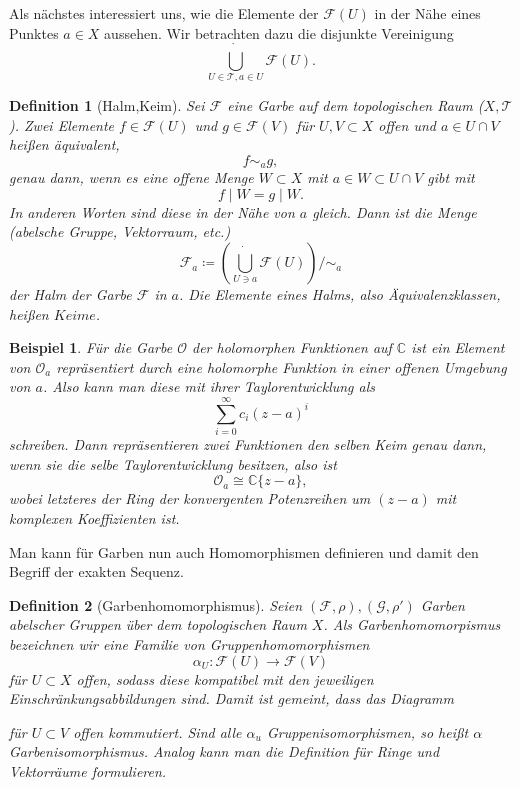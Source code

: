 \documentclass[11pt,a4paper]{scrartcl}
\theoremstyle{thm}
\theoremstyle{def}
\newtheorem{defi}{Definition}[section]
\newtheorem{bsp}{Beispiel}[section]
\theoremstyle{remark}
\begin{document}
Als nächstes interessiert uns, wie die Elemente der $\mathcal{F}(U)$ in der Nähe eines Punktes $a\in X$ aussehen. Wir betrachten dazu die disjunkte Vereinigung
\[
\dot{\bigcup_{U\in \mathcal{T},a\in U}} \mathcal{F}(U).
\]

\begin{defi}[Halm,Keim]
Sei $\mathcal{F}$ eine Garbe auf dem topologischen Raum ($X,\mathcal{T}$). Zwei Elemente $f\in\mathcal{F}(U)$ und $g\in \mathcal{F}(V)$ für $U,V\subset X$ offen und $a\in U\cap V$ heißen äquivalent,
\[
f\sim_a g,
\]
genau dann, wenn es eine offene Menge $W\subset X$ mit $a\in W\subset U\cap V$ gibt mit
\[
f\mid W = g\mid W.
\]
In anderen Worten sind diese in der Nähe von $a$ gleich. Dann ist die Menge (abelsche Gruppe, Vektorraum, etc.)
\[
\mathcal{F}_a \coloneqq \left( \dot{\bigcup_{U\ni a}} \mathcal{F}(U) \right) /\sim_a
\]
der \emph{Halm} der Garbe $\mathcal{F}$ in $a$. Die Elemente eines Halms, also Äquivalenzklassen, heißen $Keime$.
\end{defi}

\begin{bsp}
Für die Garbe $\mathcal{O}$ der holomorphen Funktionen auf $\mathbb{C}$ ist ein Element von $\mathcal{O}_a$ repräsentiert durch eine holomorphe Funktion in einer offenen Umgebung von $a$. Also kann man diese mit ihrer Taylorentwicklung als
\[
\sum_{i=0}^{\infty} c_i(z-a)^i
\]
schreiben. Dann repräsentieren zwei Funktionen den selben Keim genau dann, wenn sie die selbe Taylorentwicklung besitzen, also ist 
\[
\mathcal{O}_a \cong \mathbb{C}\{ z-a \},
\]
wobei letzteres der Ring der konvergenten Potenzreihen um $(z-a)$ mit komplexen Koeffizienten ist.
\end{bsp}

Man kann für Garben nun auch Homomorphismen definieren und damit den Begriff der exakten Sequenz.

\begin{defi}[Garbenhomomorphismus]
Seien $(\mathcal{F},\rho),(\mathcal{G},\rho')$ Garben abelscher Gruppen über dem topologischen Raum $X$. 
Als \emph{Garbenhomomorpismus} bezeichnen wir eine Familie von Gruppenhomomorphismen 
\[
\alpha_U :\mathcal{F}(U)\rightarrow \mathcal{F}(V)
\]
für $U\subset X$ offen, sodass diese kompatibel mit den jeweiligen Einschränkungsabbildungen sind. 
Damit ist gemeint, dass das Diagramm
\begin{center}
\end{center}
für $U\subset V$ offen kommutiert. 
Sind alle $\alpha_u$ Gruppenisomorphismen, so heißt $\alpha$ \emph{Garbenisomorphismus}. 
Analog kann man die Definition für Ringe und Vektorräume formulieren.
\end{defi}
\end{document}
